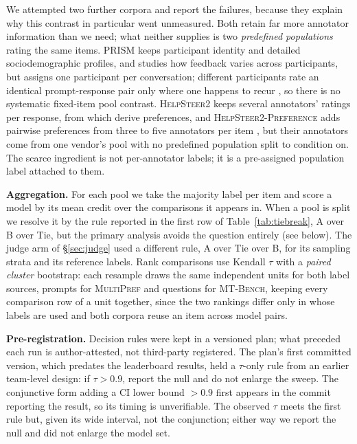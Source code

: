 \documentclass{article}
\begin{document}
We attempted two further corpora and report the failures, because they explain why this
contrast in particular went unmeasured. Both retain far more annotator information than we
need; what neither supplies is two \emph{predefined populations} rating the same items.
\textsc{PRISM} \citep{kirk2024prism} keeps participant identity and detailed
sociodemographic profiles, and studies how feedback varies across participants, but assigns
one participant per conversation; different participants rate an identical prompt-response
pair only where one happens to recur \citep[App.~S.5]{kirk2024prism}, so there is no
systematic fixed-item pool contrast. \textsc{HelpSteer2} keeps several annotators' ratings
per response, from which \citet{zhang2025diverging} derive preferences, and
\textsc{HelpSteer2-Preference} adds pairwise preferences from three to five annotators per
item \citep{wang2024helpsteer2, wang2024helpsteer2pref}, but their annotators come from one
vendor's pool with no predefined population split to condition on. The
scarce ingredient is not per-annotator labels; it is a pre-assigned population label
attached to them.

\textbf{Aggregation.} For each pool we take the majority label per item and score
a model by its mean credit over the comparisons it appears in. When a pool is split we resolve it by the
rule reported in the first row of Table~\ref{tab:tiebreak}, A over B over Tie, but the
primary analysis avoids the question entirely (see below). The judge arm of
\S\ref{sec:judge} used a different rule, A over Tie over B, for its sampling strata and its
reference labels. Rank comparisons use Kendall $\tau$ with a
\emph{paired cluster} bootstrap: each resample draws the same independent units for both
label sources, prompts for \textsc{MultiPref} and questions for \textsc{MT-Bench}, keeping
every comparison row of a unit together, since the two rankings differ only in whose labels
are used and both corpora reuse an item across model pairs.

\textbf{Pre-registration.} Decision rules were kept in a versioned plan; what preceded each
run is author-attested, not third-party registered. The plan's first committed version,
which predates the leaderboard results, held a $\tau$-only rule from an earlier team-level
design: if $\tau > 0.9$, report the null and do not enlarge the sweep. The conjunctive
form adding a CI lower bound $> 0.9$ first appears in the commit reporting the result, so
its timing is unverifiable. The observed $\tau$ meets the first rule but, given its wide
interval, not the conjunction; either way we report the null and did not enlarge the model
set.
\end{document}

